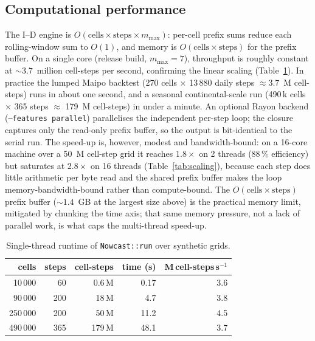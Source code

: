 \documentclass[authoryear,preprint,review,12pt]{elsarticle}
\begin{document}
\subsection{Computational performance}

The I--D engine is $O(\mathrm{cells}\times\mathrm{steps}\times m_{\max})$: per-cell
prefix sums reduce each rolling-window sum to $O(1)$, and memory is
$O(\mathrm{cells}\times\mathrm{steps})$ for the prefix buffer. On a single core
(release build, $m_{\max}=7$), throughput is roughly constant at
${\sim}3.7$~million cell-steps per second, confirming the linear scaling
(Table~\ref{tab:perf}). In practice the lumped Maipo backtest (270 cells $\times$
13\,880 daily steps $\approx 3.7$~M cell-steps) runs in about one second, and a
seasonal continental-scale run (490\,k cells $\times$ 365 steps $\approx$
179~M cell-steps) in under a minute. An optional Rayon backend
(\texttt{--features parallel}) parallelises the independent per-step loop; the
closure captures only the read-only prefix buffer, so the output is bit-identical
to the serial run. The speed-up is, however, modest and bandwidth-bound: on a
16-core machine over a 50~M cell-step grid it reaches $1.8\times$ on 2 threads
(88\,\% efficiency) but saturates at $2.8\times$ on 16 threads
(Table~\ref{tab:scaling}), because each step does little arithmetic per byte read
and the shared prefix buffer makes the loop memory-bandwidth-bound rather than
compute-bound. The $O(\mathrm{cells}\times\mathrm{steps})$ prefix buffer
(${\sim}1.4$~GB at the largest size above) is the practical memory limit,
mitigated by chunking the time axis; that same memory pressure, not a lack of
parallel work, is what caps the multi-thread speed-up.

\begin{table}[ht]
\centering
\caption{Single-thread runtime of \texttt{Nowcast::run} over synthetic grids.}
\label{tab:perf}
\begin{tabular}{@{}rrrrr@{}}
\toprule
cells & steps & cell-steps & time (s) & M\,cell-steps\,s$^{-1}$ \\
\midrule
10\,000  & 60  & 0.6\,M   & 0.17  & 3.6 \\
90\,000  & 200 & 18\,M    & 4.7   & 3.8 \\
250\,000 & 200 & 50\,M    & 11.2  & 4.5 \\
490\,000 & 365 & 179\,M   & 48.1  & 3.7 \\
\bottomrule
\end{tabular}
\end{table}
\end{document}
